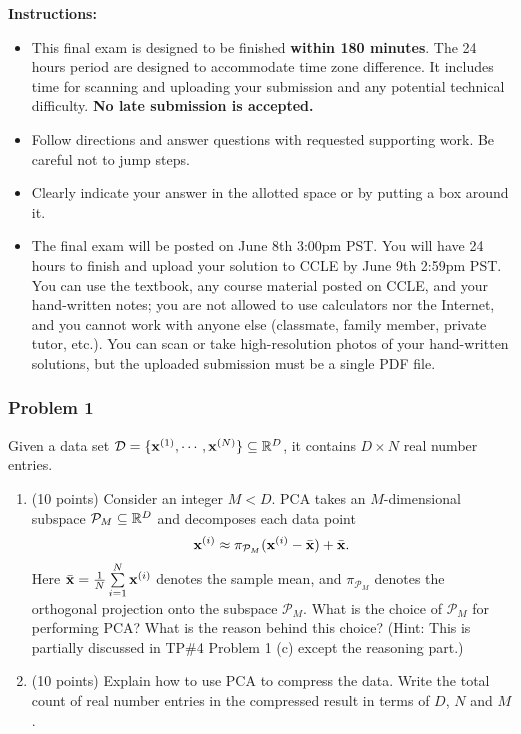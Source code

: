 \documentclass[12pt,a4paper]{article}
\renewcommand{\v}[1]{\ifmmode\mathbf{#1}\fi}
\newcommand{\SUM}[2]{\sum\limits_{#1}^{#2}}
\newcommand{\x}{\times}
\def\R{\ifmmode\mathbb R\fi}
\begin{document}
\noindent\textbf{Instructions:}
\begin{itemize}
	\item This final exam is designed to be finished \textbf{within 180 minutes}. The 24 hours period are designed to accommodate time zone difference. It includes time for scanning and uploading your submission and any potential technical difficulty. \textbf{No late submission is accepted.}
    \item Follow directions and answer questions with requested supporting work. Be careful not to jump steps. 
    \item Clearly indicate your answer in the allotted space or by putting a box around it.
    \item The final exam will be posted on June 8th 3:00pm PST. You will have 24 hours to finish and upload your solution to CCLE by June 9th 2:59pm PST. You can use the textbook, any course material posted on CCLE, and your hand-written notes; you are not allowed to use calculators nor the Internet, and you cannot work with anyone else (classmate, family member, private tutor, etc.). You can scan or take high-resolution photos of your hand-written solutions, but the uploaded submission must be a single PDF file.
\end{itemize}


\newpage
\subsubsection*{Problem 1}
Given a data set $\mathcal D = \{\v x^{(1)}, \cdots, \v x^{(N)} \} \subseteq \R^D$, it contains $D \x N$ real number entries. 
\begin{enumerate}[label=(\alph*)]
	\item (10 points)
	Consider an integer $M < D$. PCA takes an $M$-dimensional subspace $\mathcal P_M \subseteq \R^D$ and decomposes each data point
	\begin{equation*}
		\v x^{(i)} \approx \pi_{\mathcal P_M}(\v x^{(i)} - \bar {\v x}) + \bar{\v x}.
	\end{equation*}
	Here $\bar{\v x} = \frac1N\SUM{i=1}N\v x^{(i)}$ denotes the sample mean, and $\pi_{\mathcal P_M}$ denotes the orthogonal projection onto the subspace $\mathcal P_M$. What is the choice of $\mathcal P_M$ for performing PCA? What is the reason behind this choice? (Hint: This is partially discussed in TP\#4 Problem 1 (c) except the reasoning part.)
	\item (10 points)
	Explain how to use PCA to compress the data. Write the total count of real number entries in the compressed result in terms of $D$, $N$ and $M$.
\end{enumerate} 
\end{document}
